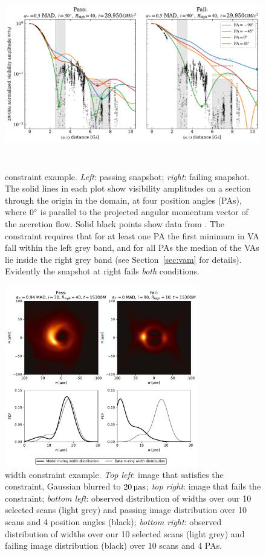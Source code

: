 \begin{figure}
  \centering
  \includegraphics[height=3.25in]{figures/passfail_va.pdf}
  \caption{\vam constraint example.
    \emph{Left}: passing snapshot;
    \emph{right}: failing snapshot.
    The solid lines in each plot show visibility amplitudes on a section through the origin in the \uv domain, at four position angles (PAs), where $0\degree$ is parallel to the projected angular momentum vector of the accretion flow.
    Solid black points show data from \aprilvii.
    The \vam constraint requires that for at least one PA the first minimum in VA fall within the left grey band, and for all PAs the median of the VAs lie inside the right grey band (see Section~\ref{sec:vam} for details).
    Evidently the snapshot at right fails {\em both} conditions.}
  \label{fig:passfail_va}
\end{figure}

\begin{figure}
  \centering
  \includegraphics[width=0.75\textwidth]{figures/mring_width_example.pdf}
  \caption{\Mring width constraint example.
    \emph{Top left}: image that satisfies the constraint, Gaussian blurred to $20\uas$;
    \emph{top right}: image that fails the constraint;
    \emph{bottom left}: observed distribution of \mring widths over our 10 selected scans (light grey) and passing image distribution over 10 scans and 4 position angles (black);
    \emph{bottom right}: observed distribution of \mring widths over our 10 selected scans (light grey) and failing image distribution (black) over 10 scans and 4 PAs.}
  \label{fig:mring_width_example}
\end{figure}

